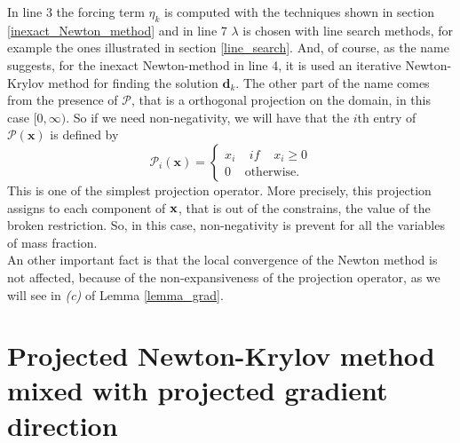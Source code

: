In line 3 the forcing term $ \eta_k $ is computed with the techniques shown in section \ref{inexact_Newton_method} and in line 7 $ \lambda $ is chosen with line search methods, for example the ones illustrated in section \ref{line_search}. And, of course, as the name suggests, for the inexact Newton-method in line 4, it is used an iterative Newton-Krylov method for finding the solution $\textbf{d}_k $.
The other part of the name comes from the presence of $ \mathcal{P} $, that is a orthogonal projection on the domain, in this case $[0, \infty)$. So if we need non-negativity, we will have that the $i$th entry of $ \mathcal{P}(\textbf{x}) $ is defined by 
\begin{equation*}
\mathcal{P}_i(\textbf{x}) = \begin{cases}
x_i\;\;\;\; if\;\;\;\; x_i \geq 0\\ 0 \;\;\;\; \text{otherwise} .
\end{cases}
\end{equation*}
This is one of the simplest projection operator.
More precisely, this projection assigns to each component of $ \textbf{\textbf{x}} $, that is out of the constrains, the value of the broken restriction. So, in this case, non-negativity is prevent for all the variables of mass fraction.\\
An other important fact is that the local convergence of the Newton method is not affected, because of the non-expansiveness of the projection operator, as we will see in \textit{(c)} of Lemma \ref{lemma_grad}.

\section{Projected Newton-Krylov method mixed with projected gradient direction}
